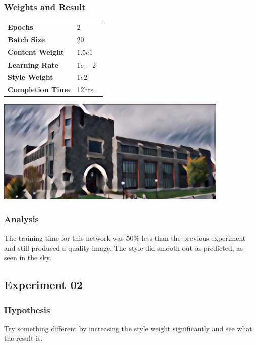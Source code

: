 \documentclass[12pt]{article}
\begin{document}
\subsubsection{Weights and Result}
\begin{minipage}[t]{0.4\textwidth}
\begin{tabular}{l l}
    \textbf{Epochs} & $2$     \\
    \textbf{Batch Size}     & $20$     \\
    \textbf{Content Weight} & $1.5e1$ \\
    \textbf{Learning Rate}  & $1e-2$  \\
    \textbf{Style Weight}   & $1e2$ \\
    \textbf{Completion Time}  & 12hrs  \
\vspace{3.5cm}\\
\end{tabular}
\end{minipage}
\begin{minipage}{0.1\textwidth}
\end{minipage}
\begin{minipage}[t]{0.6\textwidth}
\includegraphics[height=50mm]{visuals/results/01.png}
\end{minipage} \vspace{-3cm}
\subsubsection{Analysis}
The training time for this network was 50\% less than the previous experiment and still produced a quality image. The style did smooth out as predicted, as seen in the sky.

\subsection{Experiment 02}
\subsubsection{Hypothesis} Try something different by increasing the style weight significantly and see what the result is.
\end{document}
